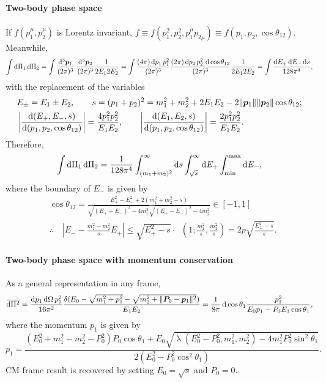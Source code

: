 \documentclass[CheatSheet]{subfiles}
\begin{document}
\paragraph{Two-body phase space}
If $f(p_1^\mu,p_2^\mu)$ is Lorentz invariant, $f\equiv f(p_1^2,p_2^2,p_1^\mu p_{2\mu})\equiv f(p_1,p_2,\cos\theta_{12})$.
Meanwhile,
\begin{equation}
 \int\dd\Pi_1\dd\Pi_2
=
\int\ddP{p_1}\,\,\ddP{p_2}\frac{1}{2E_12E_2}
=
\int\frac{(4\pi)\dd p_1\,p_1^2}{(2\pi)^3}
\frac{(2\pi)\dd p_2\,p_2^2\,\dd\cos\theta_{12}}{(2\pi)^3}\frac{1}{2E_12E_2}
=
\int\frac{\dd E_+\dd E_- \dd s}{128\pi^4},
\end{equation}
with the replacement of the variables
\begin{align*}
& E_\pm = E_1\pm E_2,
\qquad
s=(p_1+p_2)^2=m_1^2 + m_2^2 + 2E_1E_2 - 2\|{\boldsymbol{p}}_1\|\|{\boldsymbol{p}}_2\|\cos\theta_{12};\\
&
\left|\frac{\mathop{}\!\mathrm{d}(E_+,E_-,s)}{\mathop{}\!\mathrm{d}(p_1, p_2, \cos\theta_{12})}\right|=\frac{4p_1^2p_2^2}{E_1E_2},
\qquad
\left|\frac{\mathop{}\!\mathrm{d}(E_1,E_2,s)}{\mathop{}\!\mathrm{d}(p_1, p_2, \cos\theta_{12})}\right|=\frac{2p_1^2p_2^2}{E_1E_2}.
\end{align*}
Therefore, 
\begin{equation}
 \int\mathop{}\!\mathrm{d}\Pi_1\mathop{}\!\mathrm{d}\Pi_2
=
\frac{1}{128\pi^4}
\int_{(m_1+m_2)^2}^\infty\mathop{}\!\mathrm{d} s
\int_{\sqrt{s}}^\infty\mathop{}\!\mathrm{d} E_+
\int_{\text{min}}^{\mathrm{max}}\mathop{}\!\mathrm{d} E_-,
\end{equation}
where the boundary of $E_-$ is given by
\begin{align*}
 &\cos\theta_{12}=\frac{E_+^2-E_-^2+2 \left(m_1^2+m_2^2-s\right)}{\sqrt{(E_++E_-)^2-4 m_1^2}\sqrt{(E_+-E_-)^2-4 m_2^2}} \in [-1,1]\\
 &\therefore\quad
\left|E_- - \frac{m_1^2-m_2^2}{s}E_+\right| 
\le
\sqrt{E_+^2-s}\cdot\mathop{\lambda^{1/2}}\left(1;\frac{m_1^2}{s},\frac{m_2^2}{s}\right)
=
2p\sqrt{\frac{E_+^2-s}{s}}.
\end{align*}

\paragraph{Two-body phase space with momentum conservation}
As a general representation in any frame,
\begin{equation}
\overline{\mathop{}\!\mathrm{d}\Pi^2}
=\frac{\mathop{}\!\mathrm{d} p_1\mathop{}\!\mathrm{d}\Omega\,p_1^2}{16\pi^2}\frac{\delta(E_0-\sqrt{m_1^2+p_1^2}-\sqrt{m_2^2+\|{\boldsymbol{P}}_0-{\boldsymbol{p}}_1\|^2})}{E_1E_2}
=\frac{1}{8\pi}\mathop{}\!\mathrm{d}\cos\theta_{1}\frac{p_1^2}{E_0p_1-P_0E_1\cos\theta_1},
\label{eq:twobodypsgeneral}
\end{equation}
where the momentum $p_1$ is given by
\begin{equation}
p_1
=\frac{(E_0^2+m_1^2-m_2^2-P_0^2)P_0\cos\theta_1
 + E_0\sqrt{\mathop{\lambda}(E_0^2-P_0^2,m_1^2,m_2^2)-4m_1^2 P_0^2 \sin^2\theta_1}
}{2(E_0^2-P_0^2\cos^2\theta_1)}.
\end{equation}
CM frame result is recovered by setting $E_0=\sqrt{s}$ and $P_0=0$.
\end{document}
